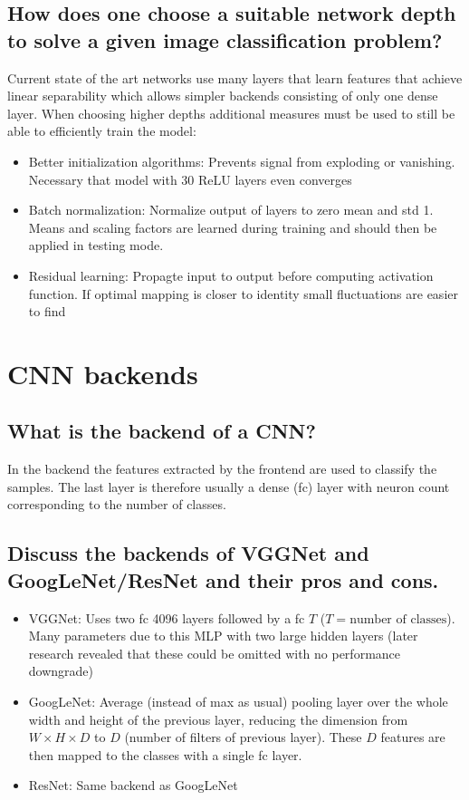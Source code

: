 \subsection{How does one choose a suitable network depth to solve a given image classification problem?}
Current state of the art networks use many layers that learn features that achieve linear separability which allows simpler backends consisting of only one dense layer. When choosing higher depths additional measures must be used to still be able to efficiently train the model:
\begin{itemize}
\item Better initialization algorithms: Prevents signal from exploding or vanishing. Necessary that model with 30 ReLU layers even converges
\item Batch normalization: Normalize output of layers to zero mean and std 1. Means and scaling factors are learned during training and should then be applied in testing mode. 
\item Residual learning: Propagte input to output before computing activation function. If optimal mapping is closer to identity small fluctuations are easier to find
\end{itemize}
%
\section{CNN backends}
\subsection{What is the backend of a CNN?}
In the backend the features extracted by the frontend are used to classify the samples. The last layer is therefore usually a dense (fc) layer with neuron count corresponding to the number of classes. 
\subsection{Discuss the backends of VGGNet and GoogLeNet/ResNet and their pros and cons.}
\begin{itemize}
\item VGGNet: Uses two fc 4096 layers followed by a fc $T$ ($T= \text{number of classes}$).  Many parameters due to this MLP with two large hidden layers (later research revealed that these could be omitted with no performance downgrade)
\item GoogLeNet: Average (instead of max as usual) pooling layer over the whole width and height of the previous layer, reducing the dimension from $W\times H\times D$ to $D$ (number of filters of previous layer). These $D$ features are then mapped to the classes with a single fc layer.
\item ResNet: Same backend as GoogLeNet
\end{itemize}
%
